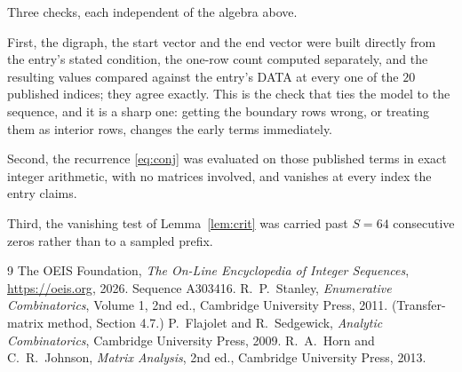 \documentclass[11pt,a4paper]{article}
\theoremstyle{plain}
\theoremstyle{definition}
\begin{document}
Three checks, each independent of the algebra above.

First, the digraph, the start vector and the end vector were built directly from the
entry's stated condition, the one-row count computed separately, and the resulting values
compared against the entry's DATA at every one of the $20$ published indices; they
agree exactly. This is the check that ties the model to the sequence, and it is a sharp one:
getting the boundary rows wrong, or treating them as interior rows, changes the early terms
immediately.

Second, the recurrence \eqref{eq:conj} was evaluated on those published terms in exact
integer arithmetic, with no matrices involved, and vanishes at every index the entry claims.

Third, the vanishing test of Lemma~\ref{lem:crit} was carried past $S=64$ consecutive
zeros rather than to a sampled prefix.

\begin{thebibliography}{9}
 The OEIS Foundation, \emph{The On-Line Encyclopedia of Integer
Sequences}, \url{https://oeis.org}, 2026. Sequence A303416.
 R.~P.~Stanley, \emph{Enumerative Combinatorics}, Volume 1, 2nd ed.,
Cambridge University Press, 2011. (Transfer-matrix method, Section 4.7.)
 P.~Flajolet and R.~Sedgewick, \emph{Analytic Combinatorics}, Cambridge
University Press, 2009.
 R.~A.~Horn and C.~R.~Johnson, \emph{Matrix Analysis}, 2nd ed., Cambridge
University Press, 2013.
\end{thebibliography}
\end{document}
